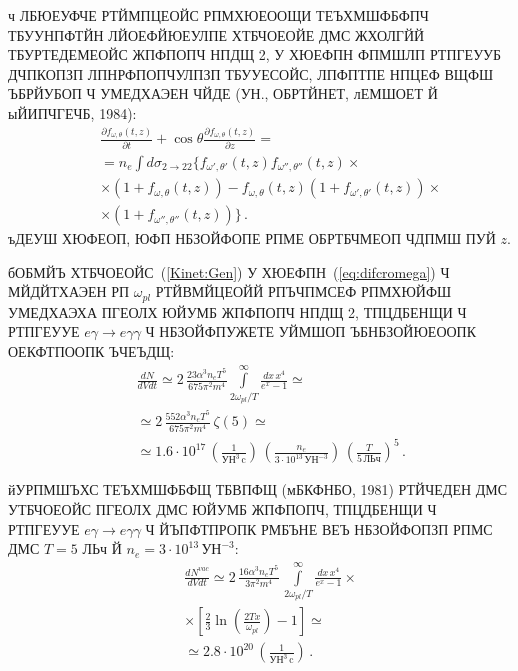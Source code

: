 \documentclass[koi8-r]{pazh2col}
\begin{document}
ч ЛБЮЕУФЧЕ РТЙМПЦЕОЙС РПМХЮЕООЩИ ТЕЪХМШФБФПЧ ТБУУНПФТЙН  ЛЙОЕФЙЮЕУЛПЕ ХТБЧОЕОЙЕ ДМС ЖХОЛГЙЙ ТБУРТЕДЕМЕОЙС 
ЖПФПОПЧ НПДЩ 2, У ХЮЕФПН ФПМШЛП РТПГЕУУБ ДЧПКОПЗП ЛПНРФПОПЧУЛПЗП ТБУУЕСОЙС, ЛПФПТПЕ  НПЦЕФ
ВЩФШ ЪБРЙУБОП Ч УМЕДХАЭЕН ЧЙДЕ (УН., ОБРТЙНЕТ, лЕМШОЕТ Й ыЙИПЧГЕЧБ, 1984):
%
\begin{eqnarray} 
\label{Kinet:Gen}
&&\frac{\partial f_{\omega,\theta}(t,z)}{\partial t} + 
\cos{\theta} \frac{\partial f_{\omega,\theta}(t,z)}{\partial z} = 
\\
\nonumber
&& = n_e \int d\sigma_{2\to 22} 
\big \{f_{\omega',\theta'}(t,z) f_{\omega'',\theta''}(t,z) \times  
\\
\nonumber
&&\times (1+f_{\omega, \theta}(t,z))-f_{\omega,\theta}(t,z) 
(1+ f_{\omega',\theta'}(t,z)) \times 
\\
\nonumber
&&\times
(1+f_{\omega'',\theta''}(t,z)) \big \} \, .
\end{eqnarray}
\noindent ъДЕУШ ХЮФЕОП, ЮФП НБЗОЙФОПЕ РПМЕ ОБРТБЧМЕОП ЧДПМШ ПУЙ $z$.

бОБМЙЪ ХТБЧОЕОЙС~(\ref{Kinet:Gen}) У ХЮЕФПН~(\ref{eq:difcromega}) Ч  МЙДЙТХАЭЕН РП $\omega_{pl}$  
РТЙВМЙЦЕОЙЙ РПЪЧПМСЕФ РПМХЮЙФШ УМЕДХАЭХА ПГЕОЛХ ЮЙУМБ 
ЖПФПОПЧ НПДЩ 2, ТПЦДБЕНЩИ Ч РТПГЕУУЕ 
$e \gamma \to e \gamma \gamma$ Ч НБЗОЙФПУЖЕТЕ УЙМШОП ЪБНБЗОЙЮЕООПК ОЕКФТПООПК ЪЧЕЪДЩ:
%
\begin{eqnarray}
\label{eq:number222}
&&\frac{d N}{d V d t}\simeq 
2 \, \frac{23 \alpha^3 n_e T^5}{675 \pi^2 m^4} \int\limits_{2 \omega_{pl}/T}^{\infty} \frac{d x \, x^4}{e^x-1}  
\simeq
\\[2 mm]
\nonumber
&&\simeq 2 \, \frac{552 \alpha^3 n_e T^5}{675 \pi^2 m^4}\, \zeta(5) \simeq
\\[2 mm]
\nonumber
&&
\simeq 1.6 \cdot 10^{17} \, \left(\frac{1}{\mbox{УН}^3\, \mbox{c}} \right) \, 
\left(\frac{n_e}{3 \cdot 10^{13}\,\mbox{УН}^{-3}} \right) \, \left(\frac{T}{5\, \mbox{ЛЬч}} \right)^5 \, .
\end{eqnarray}

йУРПМШЪХС ТЕЪХМШФБФЩ ТБВПФЩ (мБКФНБО, 1981) РТЙЧЕДЕН  ДМС УТБЧОЕОЙС ПГЕОЛХ ДМС 
ЮЙУМБ  ЖПФПОПЧ, ТПЦДБЕНЩИ Ч РТПГЕУУЕ 
$e \gamma \to e \gamma \gamma$ Ч ЙЪПФТПРОПК РМБЪНЕ ВЕЪ НБЗОЙФОПЗП РПМС ДМС $T=5$ ЛЬч Й 
$n_e=3 \cdot 10^{13}\,\mbox{УН}^{-3}$:
%
\begin{eqnarray}
\label{eq:numbervac}
&&\frac{d N^{vac}}{d V d t} \simeq  2 \, \frac{16 \alpha^3 n_e T^5}{3 \pi^2 m^4} \,
\int\limits_{2 \omega_{pl}/T}^{\infty} \frac{d x \, x^4}{e^x-1} \times 
\\[2 mm]
\nonumber
&&\times \left [\frac{2}{3} \ln{\left(\frac{2 T x}{\omega_{pl}}\right )} - 1 \right] \simeq
\\[2 mm]
\nonumber
&& \simeq 2.8 \cdot 10^{20} \, \left(\frac{1}{\mbox{УН}^3\, \mbox{c}} \right)  \, .
\end{eqnarray}
\end{document}
